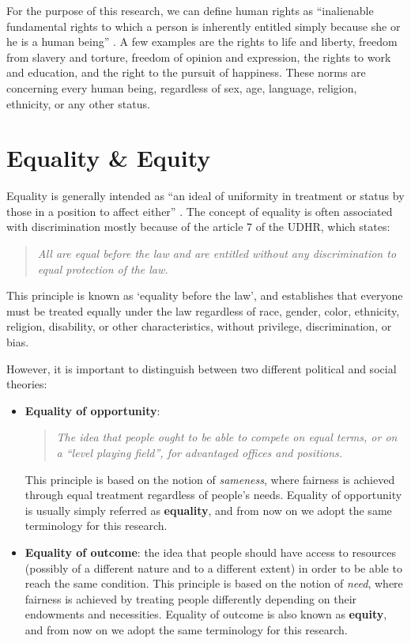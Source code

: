 For the purpose of this research, we can define human rights as ``inalienable fundamental rights to which a person is inherently entitled simply because she or he is a human being'' \cite[p.~3]{sepulveda2010human}. A few examples are the rights to life and liberty, freedom from slavery and torture, freedom of opinion and expression, the rights to work and education, and the right to the pursuit of happiness. These norms are concerning every human being, regardless of sex, age, language, religion, ethnicity, or any other status.


\section{Equality \& Equity}
\label{section:equality_equity}
Equality is generally intended as ``an ideal of uniformity in treatment or status by those in a position to affect either'' \cite{britannica2009equality}. The concept of equality is often associated with discrimination mostly because of the article 7 of the UDHR, which states:
\begin{quote}\emph{All are equal before the law and are entitled without any discrimination to equal protection of the law.} \cite{assembly1948universal}\end{quote}
This principle is known as `equality before the law', and establishes that everyone must be treated equally under the law regardless of race, gender, color, ethnicity, religion, disability, or other characteristics, without privilege, discrimination, or bias.

However, it is important to distinguish between two different political and social theories:
\begin{itemize}
\item \textbf{Equality of opportunity}:
\begin{quote}\emph{The idea that people ought to be able to compete on equal terms, or on a ``level playing field'', for advantaged offices and positions.} \cite{britannica2019equal}\end{quote}
This principle is based on the notion of \textit{sameness}, where fairness is achieved through equal treatment regardless of people's needs. Equality of opportunity is usually simply referred as \textbf{equality}, and from now on we adopt the same terminology for this research.
\item \textbf{Equality of outcome}: the idea that people should have access to resources (possibly of a different nature and to a different extent) in order to be able to reach the same condition. This principle is based on the notion of \textit{need}, where fairness is achieved by treating people differently depending on their endowments and necessities. Equality of outcome is also known as \textbf{equity}, and from now on we adopt the same terminology for this research.
\end{itemize}

